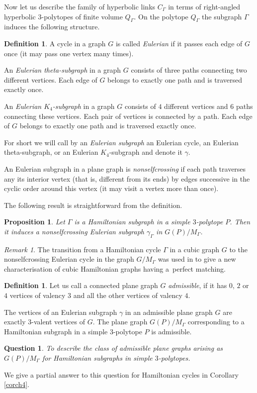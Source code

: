 \documentclass[12pt]{amsart}
\newtheorem{proposition}[formula]{Proposition}
\newtheorem{question}{Question}
\theoremstyle{definition}
\newtheorem{definition}[formula]{Definition}
\theoremstyle{remark}
\newtheorem{remark}[formula]{Remark}
\begin{document}
Now let us describe the family of hyperbolic links $C_\Gamma$ in terms of
right-angled hyperbolic $3$-polytopes of finite volume $Q_\Gamma$.  On the polytope $Q_\Gamma$ the subgraph $\Gamma$ induces the following structure.
\begin{definition}
A cycle in a graph $G$ is called {\it Eulerian} if it passes each edge of $G$ once (it may pass one vertex many times).

An {\it Eulerian theta-subgraph} in a graph $G$ consists of three paths connecting two different vertices.  Each edge
of $G$ belongs to exactly one path and is traversed exactly once.

An {\it Eulerian $K_4$-subgraph} in a graph $G$ consists of $4$ different vertices and $6$ paths connecting these vertices. 
Each pair of vertices is connected by a path. Each edge of $G$ belongs to exactly one path and is traversed exactly once.

For short we will call by an {\it  Eulerian subgraph} an Eulerian cycle, an  Eulerian theta-subgraph, or an
Eulerian $K_4$-subgraph and denote it $\gamma$.

An Eulerian subgraph in a plane graph is {\it nonselfcrossing} if each path traverses any its interior vertex 
(that is, different from its ends) by edges successive in the cyclic order around this vertex (it may visit a vertex more than once).
\end{definition}
The following result is straightforward from the definition.
\begin{proposition}\label{PEg}
Let $\Gamma$ is a Hamiltonian subgraph in a simple $3$-polytope $P$. Then it induces a nonselfcrossing
Eulerian subgraph $\gamma_\Gamma$ in $G(P)/M_{\Gamma}$.
\end{proposition}
\begin{remark}
The transition from a Hamiltonian cycle $\Gamma$ in a cubic graph $G$ to the nonselfcrossing Eulerian cycle
in the graph $G/M_{\Gamma}$ was used in \cite{BP17} to give a new characterisation of
cubic Hamiltonian graphs having a~perfect matching. 
\end{remark}

\begin{definition}
Let us call a connected plane graph $G$ {\it admissible}, if it has $0$, $2$ or $4$ vertices of valency $3$ and all 
the other vertices of valency $4$.
\end{definition}
The vertices of an Eulerian subgraph $\gamma$ in an admissible plane graph $G$ are exactly $3$-valent vertices of $G$.
The plane graph $G(P)/M_{\Gamma}$ corresponding to a Hamiltonian subgraph in a simple $3$-polytope $P$
is admissible. 
\begin{question}
To describe the class of admissible plane graphs arising as $G(P)/M_{\Gamma}$ 
for Hamiltonian subgraphs in simple $3$-polytopes.
\end{question}
We give a partial answer to this question for Hamiltonian cycles in Corollary \ref{corch4}.  
\end{document}
